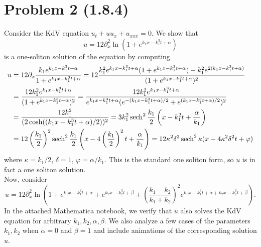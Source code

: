 \documentclass{article}
\begin{document}
\section{Problem 2 (1.8.4)}
Consider the KdV equation $u_t + uu_x + u_{xxx} = 0$. We show that $$u = 12 \partial_x^2 \ln\left(1 + e^{k_1 x - k_1^3t + \alpha}\right)$$
is a one-soliton solution of the equation by computing
\begin{align*}
u&=12 \partial_x\frac{k_1e^{k_1 x - k_1^3t + \alpha}}{1 + e^{k_1 x - k_1^3t + \alpha}}=12\frac{k_1^2e^{k_1 x - k_1^3t + \alpha}(1 + e^{k_1 x - k_1^3t + \alpha})-k_1^2e^{2(k_1 x - k_1^3t + \alpha)}}{(1 + e^{k_1 x - k_1^3t + \alpha})^2}\\&=
\frac{12k_1^2e^{k_1 x - k_1^3t + \alpha}}{(1 + e^{k_1 x - k_1^3t + \alpha})^2}=\frac{12k_1^2e^{k_1 x - k_1^3t + \alpha}}{e^{k_1 x - k_1^3t + \alpha}(e^{-(k_1 x - k_1^3t + \alpha)/2}+e^{(k_1 x - k_1^3t + \alpha)/2})^2}\\&=
\frac{12k_1^2}{(2\cosh((k_1 x - k_1^3t + \alpha)/2))^2}=3k_1^2\operatorname{sech}^2\frac{k_1}{2}\left(x-k_1^2t+\frac{\alpha}{k_1}\right)\\&=
12\left(\frac{k_1}{2}\right)^2\operatorname{sech}^2\frac{k_1}{2}\left(x-4\left(\frac{k_1}{2}\right)^2t+\frac{\alpha}{k_1}\right)=12\kappa^2\delta^2\operatorname{sech}^2\kappa(x-4\kappa^2\delta^2t+\varphi)
\end{align*}
where $\kappa=k_1/2$, $\delta=1$, $\varphi=\alpha/k_1$. This is the standard one soliton form, so $u$ is in fact a one soliton solution.\\
Now, consider 
$$u = 12 \partial_x^2\ln\left(1 + e^{k_1 x - k_1^3t + \alpha} + e^{k_2 x - k_2^3t + \beta} + \left(\frac{k_1-k_2}{k_1 + k_2}\right)^2e^{k_1x - k_1^3t + \alpha + k_2x - k_2^3t+ \beta}\right).$$
In the attached Mathematica notebook, we verify that $u$ also solves the KdV equation for arbitrary $k_1,k_2,\alpha,\beta$. We also analyze a few cases of the parameters $k_1,k_2$ when $\alpha=0$ and $\beta=1$ and include animations of the corresponding solution $u$. 
\end{document}
